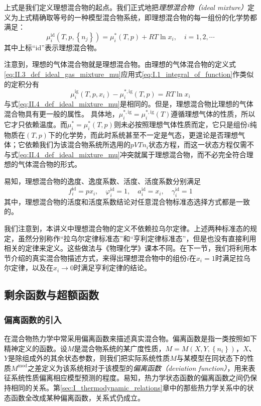 \documentclass[main.tex]{subfiles}
\begin{document}
上式是我们定义理想混合物的起点。我们正式地把\emph{理想混合物（ideal mixture）}定义为上式精确取等号的一种模型混合物系统，即理想混合物的每一组份的化学势都满足：
\begin{equation}\label{eq:II.4_def_ideal_mixture_mu}
  \mu_i^\text{id}\left(T,p,\left\{n_j\right\}\right)=\mu_i^*\left(T,p\right)+RT\ln x_i,\quad i=1,2,\cdots
\end{equation}
其中上标“id”表示理想混合物。

注意到，理想的气体混合物就是理想混合物。由理想的气体混合物的定义式\eqref{eq:II.3_def_ideal_gas_mixture_mu}应用式\eqref{eq:I.1_integral_of_function}作类似的定积分有
\[\mu_i^\text{ig}\left(T,p,x_i\right)-\mu_i^{*,\text{ig}}\left(T,p\right)=RT\ln x_i\]
与式\eqref{eq:II.4_def_ideal_mixture_mu}是相同的。但是，理想混合物比理想的气体混合物具有更一般的属性。 具体地，$\mu_i^{*,\text{ig}}=\mu_i^{*,\text{ig}}\left(T\right)$遵循理想气体的性质，所以它才只依赖温度。而$\mu_i^*=\mu_i^*\left(T,p\right)$则未必按照理想气体性质而定，它只是组份$i$纯物质在$\left(T,p\right)$下的化学势，而此时系统甚至不一定是气态，更遑论是否理想气体；它依赖我们为该混合物系统所选用的$pVTn_i$状态方程，而这一状态方程仅需不与式\eqref{eq:II.4_def_ideal_mixture_mu}冲突就属于理想混合物，而不必完全符合理想的气体混合物的形式。

易知，理想混合物的逸度、逸度系数、活度、活度系数分别满足
\[f_i^\text{id}=px_i,\quad\varphi_i^\text{id}=1,\quad a_i^\text{id}=x_i,\quad\gamma_i^\text{id}=1\]
其中，理想混合物的活度和活度系数结论对任意混合物标准态选择方式都是一致的。

我们注意到，本讲义中理想混合物的定义不依赖拉乌尔定律。上述两种标准态的规定，虽然分别称作“拉乌尔定律标准态”和“亨利定律标准态”，但是也没有直接利用相关的定律来定义。这些做法与《物理化学》课本不同。在下一节，我们将利用本节介绍的真实混合物描述方式，来得出理想混合物中的组份$i$在$x_i=1$时满足拉乌尔定律，以及在$x_i\rightarrow 0$时满足亨利定律的结论。

\subsection{剩余函数与超额函数}
\subsubsection{偏离函数的引入}
在混合物热力学中常采用偏离函数来描述真实混合物。偏离函数是指一类按照如下精神定义的函数。设$M$是混合物系统的某广度性质，$M=M\left(X,Y,\left\{n_i\right\}\right)$，$X$、$Y$是除组成外的其余状态参数，则我们把实际系统性质$M$与某模型在同状态下的性质$M^\text{mod}$之差定义为该系统相对于该模型的\emph{偏离函数（deviation function）}，用来表征系统性质偏离相应模型预测的程度。易知，热力学状态函数的偏离函数之间仍保持相同的关系。第\ref{sec:I_thermodynamic_relations}章中的那些热力学关系中的状态函数全改成某种偏离函数，关系式仍成立。
\end{document}
